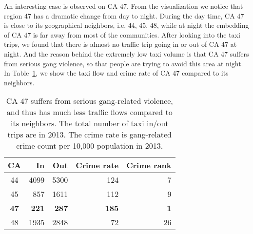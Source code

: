 An interesting case is observed on CA 47. From the visualization we notice that region 47 has a dramatic change from day to night. During the day time, CA 47 is close to its geographical neighbors, i.e. 44, 45, 48, while at night the embedding of CA 47 is far away from most of the communities. After looking into the taxi trips, we found that there is almost no traffic trip going in or out of CA 47 at night. And the reason behind the extremely low taxi volume is that CA 47 suffers from serious gang violence, so that people are trying to avoid this area at night. In Table~\ref{tab:trip-count}, we show the taxi flow and crime rate of CA 47 compared to its neighbors.




\begin{table}[h]
\centering
\caption{CA 47 suffers from serious gang-related violence, and thus has much less traffic flows compared to its neighbors. The total number of taxi in/out trips are in 2013. The crime rate is gang-related crime count per 10,000 population in 2013.}
\vspace{-3mm}
\label{tab:trip-count}
\begin{tabular}{|c|r|r|r|r|}
\hline
CA & In & Out & Crime rate & Crime rank\\ \hline
44 & 4099 & 5300 & 124 & 7\\ \hline
45 & 857 & 1611 & 112 & 9\\ \hline
\textbf{47} & \textbf{221} & \textbf{287} & \textbf{185} & \textbf{1}\\ \hline
48 & 1935 & 2848 & 72 & 26 \\ \hline
\end{tabular}
\end{table}






